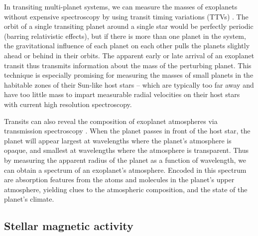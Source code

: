 In transiting multi-planet systems, we can measure the masses of exoplanets without expensive spectroscopy by using transit timing variations (TTVs) \citep{Agol2005,Holman2005}. The orbit of a single transiting planet around a single star would be perfectly periodic (barring relativistic effects), but if there is more than one planet in the system, the gravitational influence of each planet on each other pulls the planets slightly ahead or behind in their orbits. The apparent early or late arrival of an exoplanet transit thus transmits information about the mass of the perturbing planet. This technique is especially promising for measuring the masses of small planets in the habitable zones of their Sun-like host stars -- which are typically too far away and have too little mass to impart measurable radial velocities on their host stars with current high resolution spectroscopy. 

Transits can also reveal the composition of exoplanet atmospheres via transmission spectroscopy \citep{Seager2000}. When the planet passes in front of the host star, the planet will appear largest at wavelengths where the planet's atmosphere is opaque, and smallest at wavelengths where the atmosphere is transparent. Thus by measuring the apparent radius of the planet as a function of wavelength, we can obtain a spectrum of an exoplanet's atmosphere. Encoded in this spectrum are absorption features from the atoms and molecules in the planet's upper atmosphere, yielding clues to the atmospheric composition, and the state of the planet's climate. 


\subsection{Stellar magnetic activity} \label{intro:stars}

